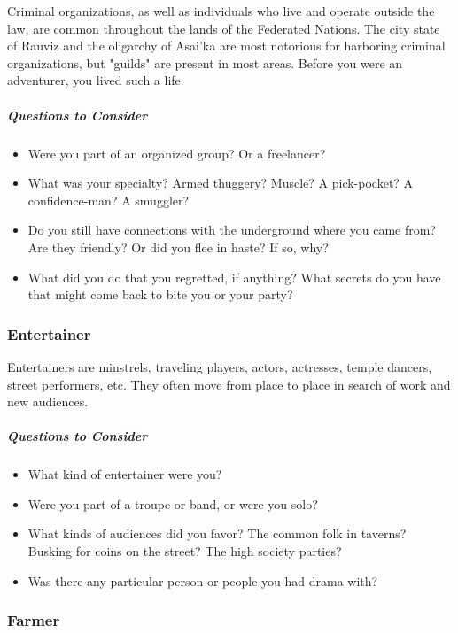 Criminal organizations, as well as individuals who live and operate outside the law, are common throughout the lands of the Federated Nations. The city state of Rauviz and the oligarchy of Asai'ka are most notorious for harboring criminal organizations, but "guilds" are present in most areas. Before you were an adventurer, you lived such a life.

\subparagraph*{Questions to Consider}
\begin{itemize}
	\item Were you part of an organized group? Or a freelancer?
	\item What was your specialty? Armed thuggery? Muscle? A pick-pocket? A confidence-man? A smuggler?
	\item Do you still have connections with the underground where you came from? Are they friendly? Or did you flee in haste? If so, why?
	\item What did you do that you regretted, if anything? What secrets do you have that might come back to bite you or your party?
\end{itemize}

\subsubsection{Entertainer}

Entertainers are minstrels, traveling players, actors, actresses, temple dancers, street performers, etc. They often move from place to place in search of work and new audiences.

\subparagraph*{Questions to Consider}
\begin{itemize}
	\item What kind of entertainer were you?
	\item Were you part of a troupe or band, or were you solo?
	\item What kinds of audiences did you favor? The common folk in taverns? Busking for coins on the street? The high society parties?
	\item Was there any particular person or people you had drama with?
\end{itemize}

\subsubsection{Farmer}

